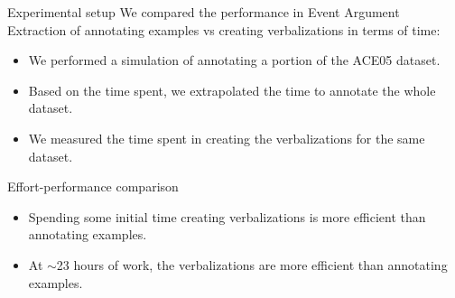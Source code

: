 \documentclass[
    11pt,
    notheorems,
    xcolor={dvipsnames},
    hyperref={
        pdfstartview=FitH, 
        pdftitle={Ikasketa-adibide urriko Informazio-Erauzketa}, 
        pdfauthor={Oscar Sainz Jimenez}, 
        citecolor=secondary, 
    }
]{beamer}
\begin{document}
\begin{frame}
    \begin{block}{Experimental setup}
        We compared the performance in Event Argument Extraction of annotating examples vs creating verbalizations in terms of time:
        \begin{itemize}
            \item We performed a simulation of annotating a portion of the ACE05 dataset.
            \item Based on the time spent, we extrapolated the time to annotate the whole dataset.
            \item We measured the time spent in creating the verbalizations for the same dataset.
        \end{itemize}
    \end{block}
\end{frame}

\begin{frame}

    \begin{block}{Effort-performance comparison}
        \begin{figure}[t]
            \vspace{-1em}
            \centering
            \resizebox{.75\textwidth}{!}{
                
            }
        \end{figure}

        \begin{itemize}
            \item Spending some initial time creating verbalizations is more efficient than annotating examples.
            \item At \(\sim \)23 hours of work, the verbalizations are more efficient than annotating examples.
        \end{itemize}
    \end{block}
\end{frame}


\end{document}
